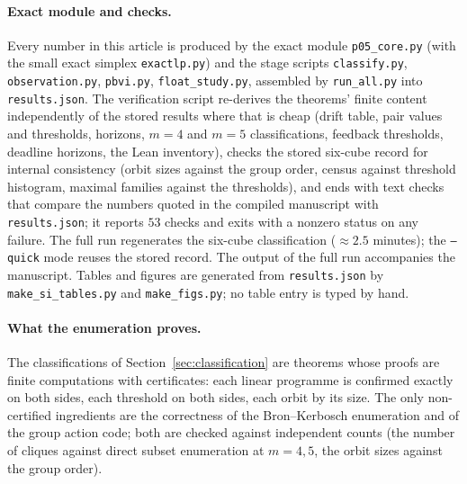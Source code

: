 \documentclass[11pt,a4paper]{article}
\theoremstyle{plain}
\theoremstyle{definition}
\theoremstyle{remark}
\newcommand{\NCHECKS}{53}
\begin{document}
\paragraph{Exact module and checks.}
Every number in this article is produced by the exact module \texttt{p05\_core.py} (with the small exact simplex \texttt{exactlp.py}) and the stage scripts \texttt{classify.py}, \texttt{observation.py}, \texttt{pbvi.py}, \texttt{float\_study.py}, assembled by \texttt{run\_all.py} into \texttt{results.json}. The verification script  re-derives the theorems' finite content independently of the stored results where that is cheap (drift table, pair values and thresholds, horizons, $m=4$ and $m=5$ classifications, feedback thresholds, deadline horizons, the Lean inventory), checks the stored six-cube record for internal consistency (orbit sizes against the group order, census against threshold histogram, maximal families against the thresholds), and ends with text checks that compare the numbers quoted in the compiled manuscript with \texttt{results.json}; it reports $\NCHECKS$ checks and exits with a nonzero status on any failure. The full run regenerates the six-cube classification ($\approx2.5$ minutes); the \texttt{--quick} mode reuses the stored record. The output of the full run accompanies the manuscript. Tables and figures are generated from \texttt{results.json} by \texttt{make\_si\_tables.py} and \texttt{make\_figs.py}; no table entry is typed by hand.

\paragraph{What the enumeration proves.}
The classifications of Section~\ref{sec:classification} are theorems whose proofs are finite computations with certificates: each linear programme is confirmed exactly on both sides, each threshold on both sides, each orbit by its size. The only non-certified ingredients are the correctness of the Bron--Kerbosch enumeration and of the group action code; both are checked against independent counts (the number of cliques against direct subset enumeration at $m=4,5$, the orbit sizes against the group order).
\end{document}

